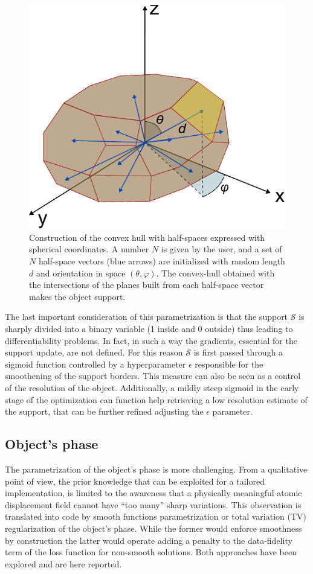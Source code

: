 \begin{figure}[H]
    \centering
    \includegraphics[width=.8\textwidth]{figures/AD/AD.pdf}
    \caption{Construction of the convex hull with half-spaces expressed with spherical coordinates. A number $N$ 
     is given by the user, and a set of $N$ half-space vectors (blue arrows) are initialized with random length $d$ and 
     orientation in space $(\theta, \varphi)$. The convex-hull obtained with the intersections of the planes built from 
     each half-space vector makes the object support.}
    \label{fig:support_construction}
\end{figure}

The last important consideration of this parametrization is that the support $\mathcal S$ is sharply divided into a binary 
variable (1 inside and 0 outside) thus leading to differentiability problems. In fact, in such a way the gradients, essential for the 
support update, are not defined. For this reason $\mathcal S$ is first passed through a sigmoid function controlled by a
hyperparameter $\epsilon$ responsible for the smoothening of the support borders. This measure can also be seen as a control of the 
resolution of the object. Additionally, a mildly steep sigmoid in the early stage of the optimization can function help retrieving 
a low resolution estimate of the support, that can be further refined adjusting the $\epsilon$ parameter. \\

\subsection{Object's phase}
The parametrization of the object's phase is more challenging. From a qualitative point of view, the prior knowledge 
that can be exploited for a tailored implementation, is limited to the awareness that a physically meaningful atomic displacement 
field cannot have ``too many'' sharp variations. This observation is translated into code by smooth functions parametrization or total 
variation (TV) regularization \cite{totalVariation1992} of the object's phase. While the former would enforce smoothness by construction the latter 
would operate adding a penalty to the data-fidelity term of the loss function for non-smooth solutions. Both approaches have been 
explored and are here reported. \\

